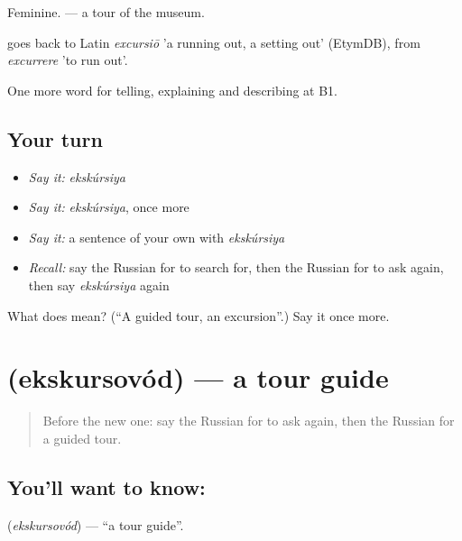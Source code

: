 Feminine. \emph{  } — a tour of the museum.

\begin{cousinweb}
\emph{} goes back to Latin \emph{excursiō} 'a running out, a setting out' (EtymDB), from \emph{excurrere} 'to run out'.
\end{cousinweb}

\begin{grammarlens}[title={What you've built}]
One more word for telling, explaining and describing at B1.
\end{grammarlens}

\subsection*{Your turn}
\begin{itemize}
\raggedright
  \item \emph{Say it:} \emph{ekskúrsiya}
  \item \emph{Say it:} \emph{ekskúrsiya}, once more
  \item \emph{Say it:} a sentence of your own with \emph{ekskúrsiya}
  \item \emph{Recall:} say the Russian for to search for, then the Russian for to ask again, then say \emph{ekskúrsiya} again
\end{itemize}

\begin{tcolorbox}[breakable,colback=teal!4,colframe=teal!35!black,title={Before you move on}]
What does  mean? (\textquotedblleft{}A guided tour, an excursion\textquotedblright{}.) Say it once more.
\end{tcolorbox}
\section[\texorpdfstring{\ru{экскурсовод} (ekskursovód)}{экскурсовод (ekskursovód)}]{ (ekskursovód) — a tour guide}

\label{lesson:RU-C442-ekskursovod}



\begin{quote}
Before the new one: say the Russian for to ask again, then the Russian for a guided tour.
\end{quote}

\subsection*{You'll want to know: }
\textbf{} (\emph{ekskursovód}) — \textquotedblleft{}a tour guide\textquotedblright{}.

